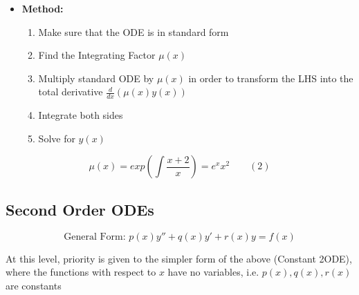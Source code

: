 \documentclass[english,course]{Notes}
\begin{document}


\begin{itemize}
\item[]\textbf{Method:}
\begin{enumerate}
	\item Make sure that the ODE is in standard form 
	\item Find the Integrating Factor $\mu(x)$
	\item Multiply standard ODE by $\mu(x)$ in order to transform the LHS into the total derivative $\frac{d}{dx}\left(\mu(x)y(x)\right)$
	\item Integrate both sides
	\item Solve for $y(x)$
\end{enumerate}
\end{itemize}


$$ \mu(x) = exp\left(\int{\frac{x+2}{x}}\right) = e^xx^2 \quad \quad (2)$$

\subsection{Second Order ODEs}

$$ \text{General Form: } p(x)y'' + q(x)y' + r(x)y = f(x)$$

\par{At this level, priority is given to the simpler form of the above (Constant 2ODE), where the functions with respect to $x$ have no variables, i.e. $p(x),q(x),r(x)$  are constants}

\end{document}
